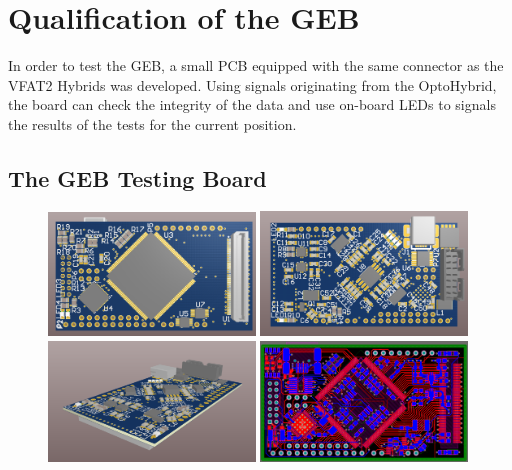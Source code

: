   \section{Qualification of the GEB}

    In order to test the GEB, a small PCB equipped with the same connector as the VFAT2 Hybrids was developed. Using signals originating from the OptoHybrid, the board can check the integrity of the data and use on-board LEDs to signals the results of the tests for the current position.

    \subsection{The GEB Testing Board}

      \begin{figure}[h!]
        \centering
        \includegraphics[width=0.49\textwidth]{img/II-5-qualification/geb-3d-0.png}
        \includegraphics[width=0.49\textwidth]{img/II-5-qualification/geb-3d-1.png}
        \vspace*{0.3cm}
        \includegraphics[width=0.49\textwidth]{img/II-5-qualification/geb-3d-2.png}
        \includegraphics[width=0.49\textwidth]{img/II-5-qualification/geb-pcb.png}
        \caption{}
        \label{fig:II-5-qualification-geb-pcb}
      \end{figure}

